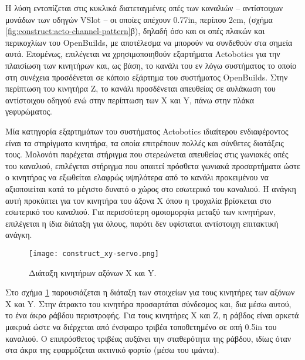 Η λύση εντοπίζεται στις κυκλικά διατεταγμένες οπές των καναλιών -- αντίστοιχων
μονάδων των οδηγών VSlot -- οι οποίες απέχουν 0.77in, περίπου 2cm, (σχήμα
\ref{fig:construct:acto-channel-pattern}β), δηλαδή όσο και οι οπές πλακών και
περικοχλίων του OpenBuilds, με αποτέλεσμα να μπορούν να συνδεθούν στα σημεία
αυτά.
Επομένως, επιλέγεται να χρησιμοποιηθούν εξαρτήματα Actobotics για την πλαισίωση
των κινητήρων και, ως βάση, το κανάλι του εν λόγω συστήματος το οποίο στη
συνέχεια προσδένεται σε κάποιο εξάρτημα του συστήματος OpenBuilds. Στην
περίπτωση του κινητήρα Z, το κανάλι προσδένεται απευθείας σε αυλάκωση του 
αντίστοιχου οδηγού ενώ στην περίπτωση των X και Y, πάνω στην πλάκα γεφυρώματος.

Μία κατηγορία εξαρτημάτων του συστήματος Actobotics ιδιαίτερου ενδιαφέροντος
είναι τα στηρίγματα κινητήρα, τα οποία επιτρέπουν πολλές και σύνθετες διατάξεις
τους. Μολονότι παρέχεται στήριγμα που στερεώνεται απευθείας στις γωνιακές οπές
του καναλιού, επιλέγεται στήριγμα που απαιτεί πρόσθετα γωνιακά προσαρτήματα ώστε
ο κινητήρας να εξωθείται ελαφρώς υψηλότερα από το κανάλι προκειμένου να
αξιοποιείται κατά το μέγιστο δυνατό ο χώρος στο εσωτερικό του καναλιού.
Η ανάγκη αυτή προκύπτει για τον κινητήρα του άξονα X όπου η τροχαλία βρίσκεται
στο εσωτερικό του καναλιού. Για περισσότερη ομοιομορφία μεταξύ των κινητήρων,
επιλέγεται η ίδια διάταξη για όλους, παρότι δεν υφίσταται αντίστοιχη επιτακτική
ανάγκη.

\begin{figure}
    \caption{Διάταξη κινητήρων αξόνων X και Y.\label{fig:construct:xy-servo}}
    \begin{center}%
    \def\svgwidth{0.5\textwidth}
%    
    \texttt{[image: construct\_xy-servo.png]}
    \end{center}
\end{figure}
%

Στο σχήμα \ref{fig:construct:xy-servo} παρουσιάζεται η διάταξη των στοιχείων για
τους κινητήρες των αξόνων X και Y.
Στην άτρακτο του κινητήρα προσαρτάται σύνδεσμος και, δια μέσω αυτού, το ένα άκρο
ράβδου περιστροφής. Για τους κινητήρες X και Z, η ράβδος είναι αρκετά μακρυά
ώστε να διέρχεται από ένσφαιρο τριβέα τοποθετημένο σε οπή 0.5in του καναλιού. Ο
επιπρόσθετος τριβέας αυξάνει την σταθερότητα της ράβδου, ιδίως όταν στα άκρα της
εφαρμόζεται ακτινικό φορτίο (μέσω του ιμάντα).

